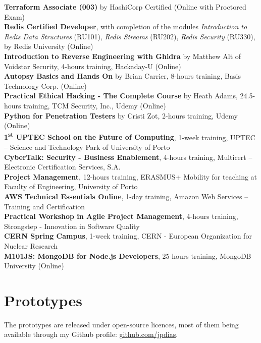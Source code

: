\documentclass[10pt, a4paper]{article}
\newcommand{\FEUP}{Faculty of Engineering, University of Porto}
\newcommand{\years}[1]{\marginnote{\raggedleft\footnotesize #1}}
\begin{document}
\years{2024}  
\textbf{Terraform Associate (003)} by HashiCorp Certified (Online with Proctored Exam)
\\[0.42em]
\years{2022}  
\textbf{Redis Certified Developer}, with completion of the modules \textit{Introduction to Redis Data Structures} (RU101), \textit{Redis Streams} (RU202), \textit{Redis Security} (RU330), by Redis University (Online)
\\[0.42em]
\years{2020}  
\textbf{Introduction to Reverse Engineering with Ghidra} by Matthew Alt of Voidstar Security, 4-hours training, Hackaday-U (Online)
\\[0.42em]
\textbf{Autopsy Basics and Hands On} by Brian Carrier, 8-hours training, Basis Technology Corp. (Online)
\\[0.42em]
\textbf{Practical Ethical Hacking - The Complete Course} by Heath Adams, 24.5-hours training, TCM Security, Inc., Udemy (Online)
\\[0.42em]
\textbf{Python for Penetration Testers} by Cristi Zot, 2-hours training, Udemy (Online)
\\[0.42em]
\years{2018} 
\textbf{1\textsuperscript{st} UPTEC School on the Future of Computing}, 1-week training, UPTEC – Science and Technology Park of University of Porto
\\[0.42em]
\years{2017} 
\textbf{CyberTalk: Security - Business Enablement}, 4-hours training, Multicert – Electronic Certification Services, S.A.
\\[0.42em]
\textbf{Project Management}, 12-hours training, ERASMUS+ Mobility for teaching at \FEUP
\\[0.42em]
\years{2016} 
\textbf{AWS Technical Essentials Online}, 1-day training, Amazon Web Services – Training and Certification
\\[0.42em]
\years{2015} 
\textbf{Practical Workshop in Agile Project Management}, 4-hours training, Strongstep - Innovation in Software Quality
\\[0.42em]
\textbf{CERN Spring Campus}, 1-week training, CERN - European Organization for Nuclear Research
\\[0.42em]
\years{2014} 
\textbf{M101JS: MongoDB for Node.js Developers}, 25-hours training, MongoDB University (Online)



\section*{Prototypes}

The prototypes are released under open-source licences, most of them being available through my Github profile:
\href{https://github.com/jpdias/}{github.com/jpdias}.
\\
\end{document}
